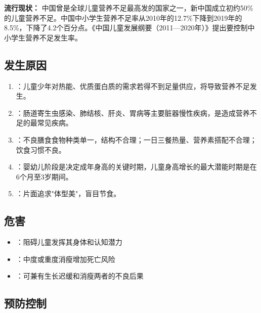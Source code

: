 \begin{keybox}
\textbf{流行现状：}
中国曾是全球儿童营养不足最高发的国家之一，新中国成立初约50\%的儿童营养不足。中国中小学生营养不足率从2010年的12.7\%下降到2019年的8.5\%，下降了4.2个百分点。《中国儿童发展纲要（2011—2020年）》提出要控制中小学生营养不足发生率。
\end{keybox}

\subsection{发生原因}

\begin{keybox}
\begin{enumerate}[leftmargin=*]
    \item {}：儿童少年对热能、优质蛋白质的需求若得不到足量供应，将导致营养不足发生。
    \item {}：肠道寄生虫感染、肺结核、肝炎、胃病等主要脏器慢性疾病，是造成营养不足的最常见疾病。
    \item {}：不良膳食食物种类单一，结构不合理；一日三餐热量、营养素搭配不合理；饮食习惯不良。
    \item {}：婴幼儿阶段是决定成年身高的关键时期，儿童身高增长的最大潜能时期是在6个月至3岁期间。
    \item {}：片面追求"体型美"，盲目节食。
\end{enumerate}
\end{keybox}

\subsection{危害}

\begin{keybox}
\begin{itemize}[leftmargin=*]
    \item {}：阻碍儿童发挥其身体和认知潜力
    \item {}：中度或重度消瘦增加死亡风险
    \item {}：可兼有生长迟缓和消瘦两者的不良后果
\end{itemize}
\end{keybox}

\subsection{预防控制}

